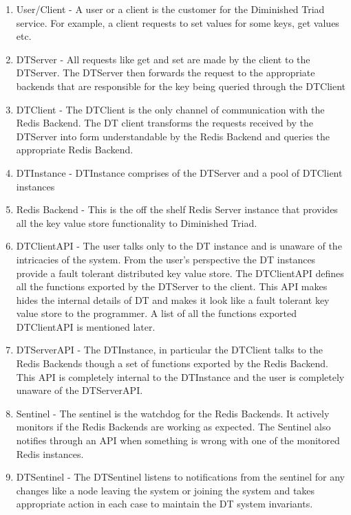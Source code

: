 \documentclass[10pt,twocolumn,letterpaper]{article}
\begin{document}
\begin{enumerate}
  \item User/Client - A user or a client is the customer for the Diminished Triad service. For example, a client requests to set values for some keys, get values etc.
  \item DTServer - All requests like get and set are made by the client to the DTServer. The DTServer then forwards the request to the appropriate backends that are responsible for the key being queried through the DTClient
  \item DTClient - The DTClient is the only channel of communication with the Redis Backend. The DT client transforms the requests received by the DTServer into form understandable by the Redis Backend and queries the appropriate Redis Backend.
  \item DTInstance - DTInstance comprises of the DTServer and a pool of DTClient instances
  \item Redis Backend - This is the off the shelf Redis Server instance that provides all the key value store functionality to Diminished Triad.
  \item DTClientAPI - The user talks only to the DT instance and is unaware of the intricacies of the system. From the user's perspective the DT instances provide a fault tolerant distributed key value store. The DTClientAPI defines all the functions exported by the DTServer to the client. This API makes hides the internal details of DT and makes it look like a fault tolerant key value store to the programmer. A list of all the functions exported DTClientAPI is mentioned later. 
  \item DTServerAPI - The DTInstance, in particular the DTClient talks to the Redis Backends though a set of functions exported by the Redis Backend. This API is completely internal to the DTInstance and the user is completely unaware of the DTServerAPI.
  \item Sentinel - The sentinel is the watchdog for the Redis Backends. It actively monitors if the Redis Backends are working as expected. The Sentinel also notifies through an API when something is wrong with one of the monitored Redis instances.
   \item DTSentinel -  The DTSentinel listens to notifications from the sentinel for any changes like a node leaving the system or joining the system and takes appropriate action in each case to maintain the DT system invariants.
\end{enumerate}
\end{document}
